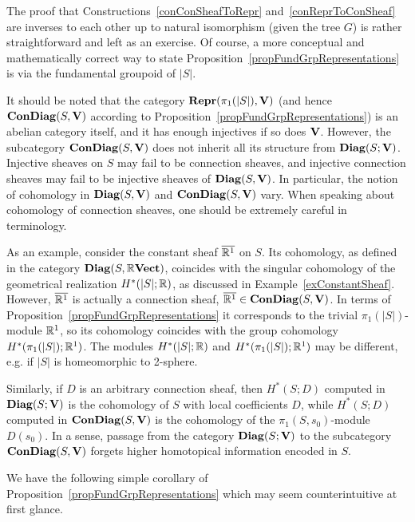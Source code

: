 The proof that Constructions~\ref{conConSheafToRepr} and~\ref{conReprToConSheaf} are inverses to each other up to natural isomorphism (given the tree $G$) is rather straightforward and left as an exercise. Of course, a more conceptual and mathematically correct way to state Proposition~\ref{propFundGrpRepresentations} is via the fundamental groupoid of $|S|$.

\begin{rem}\label{remConnectionCohomology}
It should be noted that the category $\mathbf{Repr}(\pi_1(|S|),\mathbf{V})$ (and hence $\mathbf{ConDiag}(S,\mathbf{V})$ according to Proposition~\ref{propFundGrpRepresentations}) is an abelian category itself, and it has enough injectives if so does $\mathbf{V}$. However, the subcategory $\mathbf{ConDiag}(S,\mathbf{V})$ does not inherit all its structure from $\mathbf{Diag}(S;\mathbf{V})$. Injective sheaves on $S$ may fail to be connection sheaves, and injective connection sheaves may fail to be injective sheaves of $\mathbf{Diag}(S,\mathbf{V})$. In particular, the notion of cohomology in $\mathbf{Diag}(S,\mathbf{V})$ and $\mathbf{ConDiag}(S,\mathbf{V})$ vary. When speaking about cohomology of connection sheaves, one should be extremely careful in terminology.
\end{rem}

\begin{ex}\label{exConstantCohomologyConnection}
As an example, consider the constant sheaf $\overline{\mathbb{R}^1}$ on $S$. Its cohomology, as defined in the category $\mathbf{Diag}(S,\mathbb{R}\mathbf{Vect})$, coincides with the singular cohomology of the geometrical realization $H^*(|S|;\mathbb{R})$, as discussed in Example~\ref{exConstantSheaf}. However, $\overline{\mathbb{R}^1}$ is actually a connection sheaf, $\overline{\mathbb{R}^1}\in\mathbf{ConDiag}(S,\mathbf{V})$. In terms of Proposition~\ref{propFundGrpRepresentations} it corresponds to the trivial $\pi_1(|S|)$-module $\mathbb{R}^1$, so its cohomology coincides with the group cohomology $H^*(\pi_1(|S|);\mathbb{R}^1)$. The modules $H^*(|S|;\mathbb{R})$ and $H^*(\pi_1(|S|);\mathbb{R}^1)$ may be different, e.g. if $|S|$ is homeomorphic to 2-sphere.

Similarly, if $D$ is an arbitrary connection sheaf, then $H^*(S;D)$ computed in $\mathbf{Diag}(S;\mathbf{V})$ is the cohomology of $S$ with local coefficients $D$, while $H^*(S;D)$ computed in $\mathbf{ConDiag}(S,\mathbf{V})$ is the cohomology of the $\pi_1(S,s_0)$-module $D(s_0)$. In a sense, passage from the category $\mathbf{Diag}(S;\mathbf{V})$ to the subcategory $\mathbf{ConDiag}(S,\mathbf{V})$ forgets higher homotopical information encoded in $S$.
\end{ex}

We have the following simple corollary of Proposition~\ref{propFundGrpRepresentations} which may seem counterintuitive at first glance.

